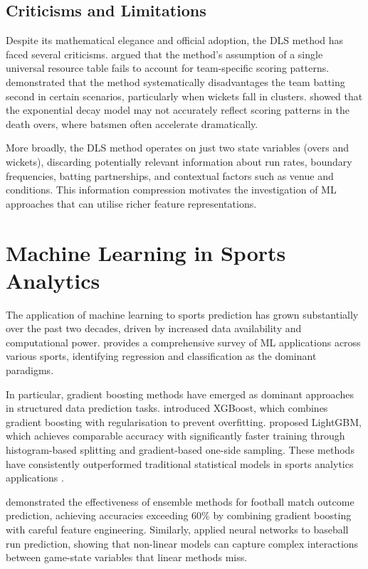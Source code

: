 \documentclass[12pt,a4paper,oneside]{report}
\begin{document}
\subsection{Criticisms and Limitations}

Despite its mathematical elegance and official adoption, the DLS method has faced several criticisms. \citet{mchale2011modelling} argued that the method's assumption of a single universal resource table fails to account for team-specific scoring patterns. \citet{bhattacharya2011revised} demonstrated that the method systematically disadvantages the team batting second in certain scenarios, particularly when wickets fall in clusters. \citet{carter2005model} showed that the exponential decay model may not accurately reflect scoring patterns in the death overs, where batsmen often accelerate dramatically.

More broadly, the DLS method operates on just two state variables (overs and wickets), discarding potentially relevant information about run rates, boundary frequencies, batting partnerships, and contextual factors such as venue and conditions. This information compression motivates the investigation of ML approaches that can utilise richer feature representations.

\section{Machine Learning in Sports Analytics}

The application of machine learning to sports prediction has grown substantially over the past two decades, driven by increased data availability and computational power. \citet{bunker2019machine} provides a comprehensive survey of ML applications across various sports, identifying regression and classification as the dominant paradigms.

In particular, gradient boosting methods have emerged as dominant approaches in structured data prediction tasks. \citet{chen2016xgboost} introduced XGBoost, which combines gradient boosting with regularisation to prevent overfitting. \citet{ke2017lightgbm} proposed LightGBM, which achieves comparable accuracy with significantly faster training through histogram-based splitting and gradient-based one-side sampling. These methods have consistently outperformed traditional statistical models in sports analytics applications \citep{bunker2019machine}.

\citet{baboota2019predictive} demonstrated the effectiveness of ensemble methods for football match outcome prediction, achieving accuracies exceeding 60\% by combining gradient boosting with careful feature engineering. Similarly, \citet{huang2010neural} applied neural networks to baseball run prediction, showing that non-linear models can capture complex interactions between game-state variables that linear methods miss.
\end{document}
